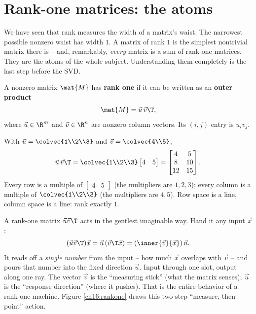\section{Rank-one matrices: the atoms}

We have seen that rank measures the width of a matrix's waist. The narrowest
possible nonzero waist has width $1$. A matrix of rank $1$ is the simplest
nontrivial matrix there is -- and, remarkably, \emph{every} matrix is a sum of
rank-one matrices. They are the atoms of the whole subject. Understanding them
completely is the last step before the SVD.

\begin{definition}\label{ch16:rank-one-def}
A nonzero matrix $\mat{M}$ has \textbf{rank one} if it can be written as an
\textbf{outer product}
\[
  \mat{M} = \vec{u}\,\vec{v}\T,
\]
where $\vec{u}\in\R^m$ and $\vec{v}\in\R^n$ are nonzero column vectors. Its
$(i,j)$ entry is $u_i v_j$.
\end{definition}

\begin{example}\label{ch16:outer}
With $\vec{u}=\colvec{1\\2\\3}$ and $\vec{v}=\colvec{4\\5}$,
\[
  \vec{u}\,\vec{v}\T
  = \colvec{1\\2\\3}\begin{bmatrix}4 & 5\end{bmatrix}
  = \begin{bmatrix} 4 & 5 \\ 8 & 10 \\ 12 & 15 \end{bmatrix}.
\]
Every row is a multiple of $\begin{bmatrix}4 & 5\end{bmatrix}$ (the multipliers
are $1,2,3$); every column is a multiple of $\colvec{1\\2\\3}$ (the multipliers
are $4,5$). Row space is a line, column space is a line: rank exactly $1$.
\end{example}

\begin{intuitionbox}
A rank-one matrix $\vec{u}\vec{v}\T$ acts in the gentlest imaginable way. Hand it
any input $\vec{x}$:
\[
  (\vec{u}\vec{v}\T)\vec{x} = \vec{u}\,(\vec{v}\T\vec{x})
  = (\inner{\vec v}{\vec x})\,\vec{u}.
\]
It reads off a \emph{single number} from the input -- how much $\vec{x}$ overlaps
with $\vec{v}$ -- and pours that number into the fixed direction $\vec{u}$. Input
through one slot, output along one ray. The vector $\vec{v}$ is the ``measuring
stick'' (what the matrix senses); $\vec{u}$ is the ``response direction'' (where
it pushes). That is the entire behavior of a rank-one machine. Figure
\ref{ch16:rankone} draws this two-step ``measure, then point'' action.
\end{intuitionbox}

